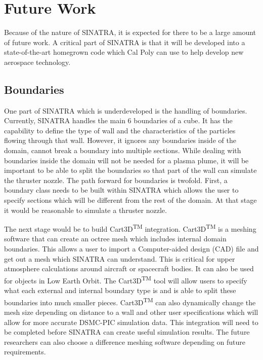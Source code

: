 
\section{Future Work}
\label{sec:future}
Because of the nature of SINATRA, it is expected for there to be a large amount of future work. A critical part of SINATRA is that it will be developed into a state-of-the-art homegrown code which Cal Poly can use to help develop new aerospace technology.

\subsection{Boundaries}

One part of SINATRA which is underdeveloped is the handling of boundaries. Currently, SINATRA handles the main 6 boundaries of a cube. It has the capability to define the type of wall and the characteristics of the particles flowing through that wall. However, it ignores any boundaries inside of the domain, cannot break a boundary into multiple sections. While dealing with boundaries inside the domain will not be needed for a plasma plume, it will be important to be able to split the boundaries so that part of the wall can simulate the thruster nozzle. The path forward for boundaries is twofold. First, a boundary class needs to be built within SINATRA which allows the user to specify sections which will be different from the rest of the domain. At that stage it would be reasonable to simulate a thruster nozzle. \par

\indent The next stage would be to build Cart3D\textsuperscript{TM} integration. Cart3D\textsuperscript{TM} is a meshing software that can create an octree mesh which includes internal domain boundaries. This allows a user to import a Computer-aided design (CAD) file and get out a mesh which SINATRA can understand. This is critical for upper atmosphere calculations around aircraft or spacecraft bodies. It can also be used for objects in Low Earth Orbit. The Cart3D\textsuperscript{TM} tool will allow users to specify what each external and internal boundary type is and is able to split these boundaries into much smaller pieces. Cart3D\textsuperscript{TM} can also dynamically change the mesh size depending on distance to a wall and other user specifications which will allow for more accurate DSMC-PIC simulation data. This integration will need to be completed before SINATRA can create useful simulation results. The future researchers can also choose a difference meshing software depending on future requirements. \par


